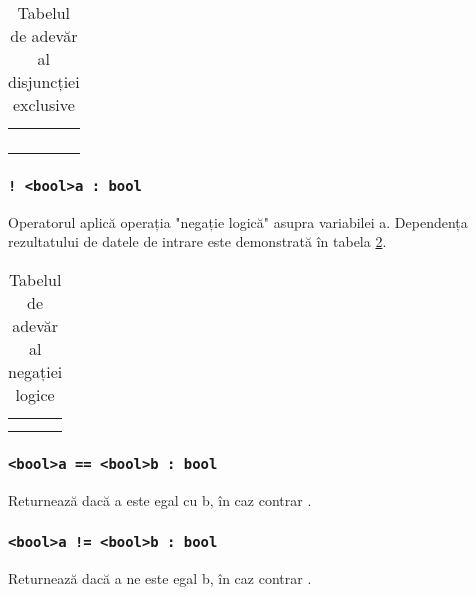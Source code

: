 \begin{table}[htb]
	\caption{Tabelul de adevăr al disjuncției exclusive}
	\label{logdifftable}
	\begin{tabular}{|c|c|c|}
		\hline
		\code{a} & \code{b} & \code{a \^ b} \\ \hline
		\false{} & \false{} & \false{}  	\\ \hline
		\false{} & \true{}  & \true{}   	\\ \hline
		\true{}  & \false{} & \true{}  		\\ \hline
		\true{}  & \true{}  & \false{}  	\\ \hline
	\end{tabular}
	\vspace{-2em}
\end{table}

\subsubsection{\lstinline|! <bool>a : bool|}

Operatorul aplică operația "negație logică" asupra variabilei a. Dependența rezultatului de datele de intrare este demonstrată în tabela  \ref{invtable}.

\begin{table}[htb]
	\caption{Tabelul de adevăr al negației logice}
	\label{invtable}
	\begin{tabular}{|c|c|}
		\hline
		\code{a} & \code{!a} \\ \hline
		\false{} & \true{} 	 \\ \hline
		\true{}  & \false{}  \\ \hline
	\end{tabular}
	\vspace{-2em}
\end{table}

\subsubsection{\lstinline`<bool>a == <bool>b : bool`}

Returnează \true{} dacă a este egal cu b, în caz contrar \false{}.

\subsubsection{\lstinline`<bool>a != <bool>b : bool`}

Returnează \true{} dacă a ne este egal b, în caz contrar \false{}.

